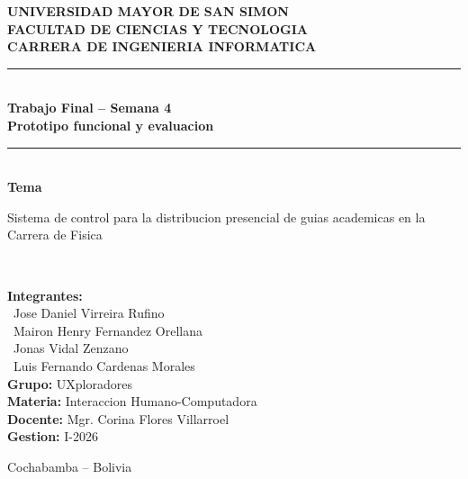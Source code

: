 \documentclass[12pt,letterpaper]{article}
\begin{document}
\begin{titlepage}
\begingroup
    \fontsize{12}{14.4}\selectfont
    \centering

    \vspace*{1.1cm}

    {\large \textbf{UNIVERSIDAD MAYOR DE SAN SIMON}}\\[0.18cm]
    {\large \textbf{FACULTAD DE CIENCIAS Y TECNOLOGIA}}\\[0.18cm]
    {\large \textbf{CARRERA DE INGENIERIA INFORMATICA}}\\[0.95cm]

    \rule{0.88\textwidth}{0.5pt}\\[0.65cm]
    {\Large \textbf{Trabajo Final -- Semana 4}}\\[0.45cm]
    {\large \textbf{Prototipo funcional y evaluacion}}\\[0.65cm]
    \rule{0.88\textwidth}{0.5pt}\\[1.25cm]

    {\large \textbf{Tema}}\\[0.45cm]
    \begin{minipage}{0.82\textwidth}
        \centering
        {\large Sistema de control para la distribucion presencial de guias academicas en la Carrera de Fisica}
    \end{minipage}\\[1.65cm]

    \begin{minipage}{0.88\textwidth}
        \raggedright
        \textbf{Integrantes:}\\[0.2cm]
        \hspace*{0.5cm}\textbullet\ Jose Daniel Virreira Rufino\\[0.12cm]
        \hspace*{0.5cm}\textbullet\ Mairon Henry Fernandez Orellana\\[0.12cm]
        \hspace*{0.5cm}\textbullet\ Jonas Vidal Zenzano\\[0.12cm]
        \hspace*{0.5cm}\textbullet\ Luis Fernando Cardenas Morales\\[0.65cm]

        \textbf{Grupo:} UXploradores\\[0.16cm]
        \textbf{Materia:} Interaccion Humano-Computadora\\[0.16cm]
        \textbf{Docente:} Mgr. Corina Flores Villarroel\\[0.16cm]
        \textbf{Gestion:} I-2026
    \end{minipage}

    \vfill

    \begin{center}
        {\small Cochabamba -- Bolivia}
    \end{center}
\endgroup
\end{titlepage}
\end{document}
